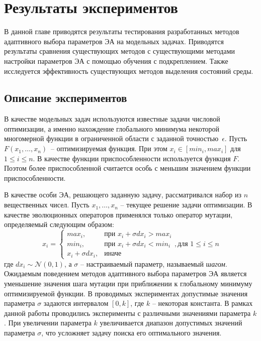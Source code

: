 \chapter{Результаты экспериментов}
\label{chapter_results}

В данной главе приводятся результаты тестирования разработанных методов адаптивного выбора параметров ЭА на модельных задачах. Приводятся результаты сравнения существующих методов с существующими методами настройки параметров ЭА с помощью обучения с подкреплением. Также исследуется эффективность существующих методов выделения состояний среды.

\section{Описание экспериментов}

В качестве модельных задач используются известные задачи числовой оптимизации, а именно нахождение глобального минимума некоторой многомерной функции в ограниченной области с заданной точностью~$\epsilon$. Пусть $F(x_1, \ldots, x_n)$~-- оптимизируемая функция. При этом $x_i \in [min_i, max_i]$ для $1 \le i \le n$. В качестве функции приспособленности используется функция $F$. Поэтом более приспособленной считается особь с меньшим значением функции приспособленности.

В качестве особи ЭА, решающего заданную задачу, рассматривался набор из $n$ вещественных чисел. Пусть $x_1, \ldots, x_n$ -- текущее решение задачи оптимизации. В качестве эволюционных операторов применялся только оператор мутации, определяемый следующим образом:
\begin{equation}
x_i = \begin{cases}
	max_i, &\text{при } x_i + \sigma dx_i > max_i \\
	min_i, &\text{при } x_i + \sigma dx_i < min_i \\
	x_i + \sigma dx_i, &\text{иначе}
      \end{cases}, \text{для } 1 \le i \le n
\end{equation}
где $dx_i \sim \mathcal{N}(0, 1)$, а $\sigma$ -- настраиваемый параметр, называемый \textit{шагом}. Ожидаемым поведением методов адаптивного выбора параметров ЭА является уменьшение значения шага мутации при приближении к глобальному минимуму оптимизируемой функции. В проводимых экспериментах допустимые значения параметра $\sigma$ задаются интервалом $[0, k]$, где $k$ -- некоторая константа. В рамках данной работы проводились эксперименты с различными значениями параметра $k$. При увеличении параметра $k$ увеличивается диапазон допустимых значений параметра $\sigma$, что усложняет задачу поиска его оптимального значения.

